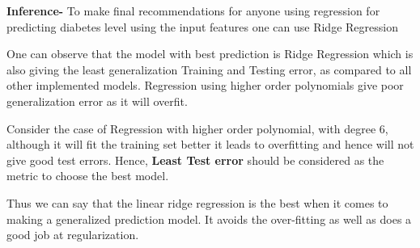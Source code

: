 \documentclass[12pt]{extarticle}
\begin{document}
\vspace{3mm}
\textbf{Inference-} To make ﬁnal recommendations for anyone using regression for predicting diabetes level using the input features one can use Ridge Regression

One can observe that the model with best prediction is Ridge Regression which is also giving the least generalization Training and Testing error, as compared to all other implemented models. Regression using higher order polynomials give poor generalization error as it will overfit.

\vspace{3mm}
Consider the case of Regression with higher order polynomial, with degree 6, although it will fit the training set better it leads to overfitting and hence will not give good test errors. Hence,\textbf{ Least Test error} should be considered as the metric to choose the best model.

\vspace{3mm}
Thus we can say that the linear ridge regression is the best when it comes to making a generalized prediction model. It avoids the over-fitting as well as does a good job at regularization.
\end{document}
